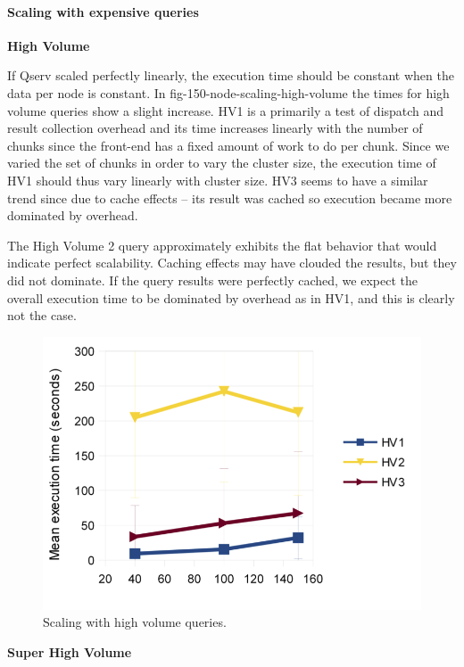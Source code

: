 \documentclass[DM,lsstdraft,toc]{lsstdoc}
\begin{document}
\paragraph{Scaling with expensive
queries}\label{scaling-with-expensive-queries}

\textbf{High Volume}

If Qserv scaled perfectly linearly, the execution time should be
constant when the data per node is constant. In
fig-150-node-scaling-high-volume the times for high volume queries show
a slight increase. HV1 is a primarily a test of dispatch and result
collection overhead and its time increases linearly with the number of
chunks since the front-end has a fixed amount of work to do per chunk.
Since we varied the set of chunks in order to vary the cluster size, the
execution time of HV1 should thus vary linearly with cluster size. HV3
seems to have a similar trend since due to cache effects -- its result
was cached so execution became more dominated by overhead.

The High Volume 2 query approximately exhibits the flat behavior that
would indicate perfect scalability. Caching effects may have clouded the
results, but they did not dominate. If the query results were perfectly
cached, we expect the overall execution time to be dominated by overhead
as in HV1, and this is clearly not the case.

\begin{figure}[H]
\centering
\includegraphics{_static/150_node_scaling_high_volume.png}
\caption{Scaling with high volume queries.}
\end{figure}

\textbf{Super High Volume}
\end{document}
